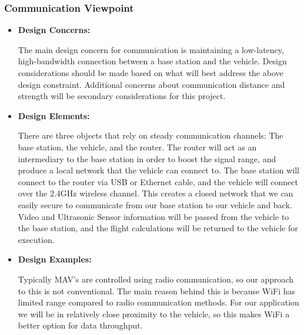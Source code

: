\documentclass[onecolumn, draftclsnofoot,10pt, compsoc]{IEEEtran}
\begin{document}
    

\subsubsection{Communication Viewpoint} 
\begin{itemize}
 \item{ \textbf{Design Concerns:}}

The main design concern for communication is maintaining a low-latency, high-bandwidth connection between a base station and the vehicle. Design considerations should be made based on what will best address the above design constraint. Additional concerns about communication distance and strength will be secondary considerations for this project. \\ 

\item{ \textbf{Design Elements:}}

There are three objects that rely on steady communication channels: The base station, the vehicle, and the router. The router will act as an intermediary to the base station in order to boost the signal range, and produce a local network that the vehicle can connect to. The base station will connect to the router via USB or Ethernet cable, and the vehicle will connect over the 2.4GHz wireless channel. This creates a closed network that we can easily secure to communicate from our base station to our vehicle and back. Video and Ultrasonic Sensor information will be passed from the vehicle to the base station, and the flight calculations will be returned to the vehicle for execution. \\

\item{ \textbf{Design Examples:}}

Typically MAV's are controlled using radio communication, so our approach to this is not conventional. The main reason behind this is because WiFi has limited range compared to radio communication methods. For our application we will be in relatively close proximity to the vehicle, so this makes WiFi a better option for data throughput. \\


\end{itemize}
\end{document}
